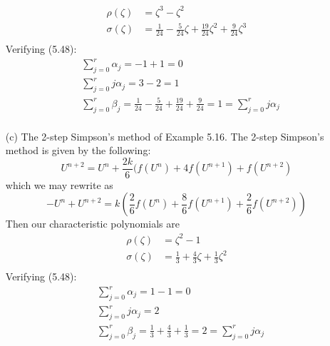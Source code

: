 \documentclass{article}
\begin{document}
\begin{enumerate}
    \begin{align*}
        \rho(\zeta) &= \zeta^3 - \zeta^2 \\
        \sigma(\zeta) &= \frac{1}{24} - \frac{5}{24}\zeta + \frac{19}{24}\zeta^2 + \frac{9}{24}\zeta^3 \\
    \end{align*}
    Verifying (5.48):
    \begin{align*}
        &\sum_{j=0}^r \alpha_j = -1 + 1 = 0 \\
        &\sum_{j=0}^r j\alpha_j = 3 - 2 = 1 \\
        &\sum_{j=0}^r \beta_j = \frac{1}{24} - \frac{5}{24} + \frac{19}{24} + \frac{9}{24} = 1 = \sum_{j=0}^r j\alpha_j \\
    \end{align*}
    
    \item[(c)] The 2-step Simpson's method of Example 5.16.
    \newline
    The 2-step Simpson's method is given by the following:
    \[U^{n+2} = U^n + \frac{2k}{6}(f(U^n) + 4f(U^{n+1}) + f(U^{n+2})\]
    which we may rewrite as
    \[-U^n + U^{n+2} = k \left( \frac{2}{6}f(U^n) + \frac{8}{6}f(U^{n+1}) + \frac{2}{6}f(U^{n+2}) \right)\]
    Then our characteristic polynomials are
    \begin{align*}
        \rho(\zeta) &= \zeta^2 - 1 \\
        \sigma(\zeta) &= \frac{1}{3} + \frac{4}{3}\zeta + \frac{1}{3}\zeta^2 \\
    \end{align*}
    Verifying (5.48):
    \begin{align*}
        &\sum_{j=0}^r \alpha_j = 1 - 1 = 0 \\
        &\sum_{j=0}^r j\alpha_j = 2 \\
        &\sum_{j=0}^r \beta_j = \frac{1}{3} + \frac{4}{3} + \frac{1}{3} = 2 = \sum_{j=0}^r j\alpha_j \\
    \end{align*}
\end{enumerate}
\end{document}

